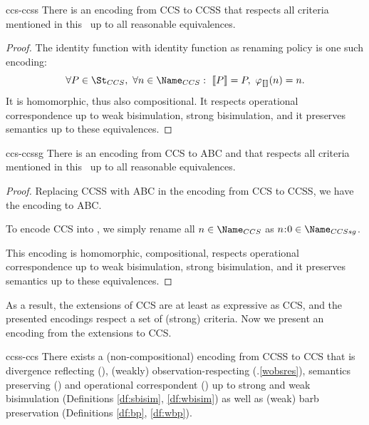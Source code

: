 \documentclass[adraft,hidelinks]{eptcs}
\begin{document}
\begin{proposition}{ccs-ccss}
  There is an encoding from CCS to CCSS that respects all criteria mentioned in this \this\ up to all reasonable equivalences.
\end{proposition}

\begin{proof}
  The identity function with identity function as renaming policy is one such encoding:
  \[
  \forall P\in\Sccs,\ \forall n \in \Name_{CCS}:\ \bkt{P} = P,\ \ren{n} = n.
  \]
  It is homomorphic, thus also compositional.
  It respects operational correspondence up to weak bisimulation, strong bisimulation, and it preserves semantics up to these equivalences.
\end{proof}

\begin{proposition}{ccs-ccssg}
  There is an encoding from CCS to ABC and \CSG that respects all criteria mentioned in this \this\ up to all reasonable equivalences.
\end{proposition}

\begin{proof}
  Replacing CCSS with ABC in the encoding from CCS to CCSS, we have the encoding to ABC.

  To encode CCS into \CSG, we simply rename all $n\in \Name_{CCS}$ as $n\cln 0 \in \Name_{CCS{sg}}$.

  This encoding is homomorphic, compositional, respects operational correspondence up to weak bisimulation, strong bisimulation, and it preserves semantics up to these equivalences.
\end{proof}

As a result, the extensions of CCS are at least as expressive as CCS, and the presented encodings respect a set of (strong) criteria.
Now we present an encoding from the extensions to CCS.

\begin{proposition}{ccss-ccs}
  There exists a (non-compositional) encoding from CCSS to CCS that is divergence reflecting (), (weakly) observation-respecting (.\ref{wobsres}), semantics preserving () and operational correspondent () up to strong and weak bisimulation (Definitions \ref{df:sbisim}, \ref{df:wbisim}) as well as (weak) barb preservation (Definitions \ref{df:bp}, \ref{df:wbp}).
\end{proposition}
\end{document}

